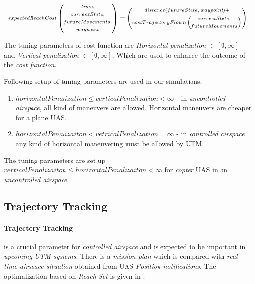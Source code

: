 \begin{equation}\label{eq:costFunctionReachable}
    \scriptsize
    \begin{gathered} expectedReachCost\end{gathered} \left(\begin{gathered}time,\\currentState,\\futureMovements,\\waypoint\end{gathered}\right)
    =
    \left (\begin{gathered}distance(futureState,waypoint)+\\ costTrajectoryFlown\left(\begin{gathered}currectState,\\futureMovements\end{gathered}\right) \end{gathered}\right)
    \normalsize
\end{equation}

\begin{note}
    The tuning parameters of cost function are \emph{Horizontal penalization} $\in [0,\infty]$ and \emph{Vertical penalization} $\in [0,\infty]$. Which are used to enhance the outcome of the \emph{cost function}.
    
    Following setup of tuning parameters are used in our simulations:
    \begin{enumerate}
        \item $horizontalPenalization \le verticalPenalization < \infty$ - in  \emph{uncontrolled airspace}, all kind of maneuvers are allowed. Horizontal maneuvers are cheaper for a plane UAS.
        \item $horizontalPenalizaiton < vetricalPenalization = \infty$ - in  \emph{controlled airspace} any kind of horizontal maneuvering must be allowed by UTM.
    \end{enumerate}
    
    The tuning parameters are set up $verticalPenalizaiton \le horizontalPenalizaiton < \infty$ for \emph{copter} UAS in an \emph{uncontrolled airspace}
\end{note}

\subsection{Trajectory Tracking}\label{s:trajectoryTracking}
\paragraph{Trajectory Tracking} is a crucial parameter for \emph{controlled airspace} and is expected to be important in \emph{upcoming UTM systems}. There is a \emph{mission plan} which is compared with \emph{real-time airspace situation} obtained from UAS \emph{Position notifications}. The optimalization based on \emph{Reach Set} is given in \cite{varaiya2000reach}.

